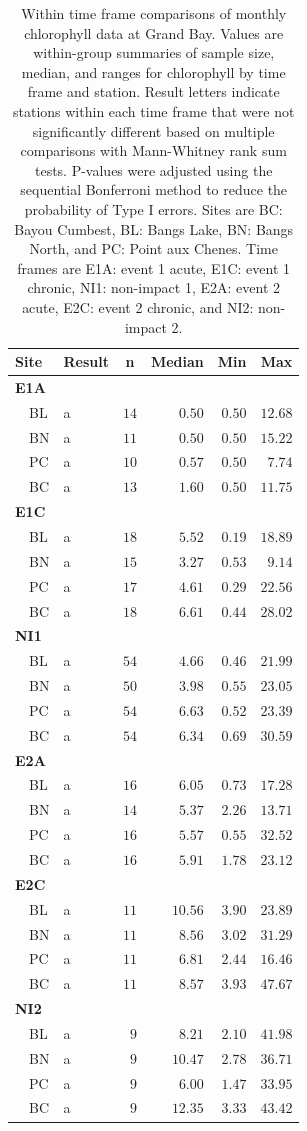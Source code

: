 \documentclass[letterpaper,12pt]{article}\usepackage[]{graphicx}\usepackage[]{color}
\begin{document}
\clearpage

\begin{table}[!tbp]
\caption{Within time frame comparisons of monthly chlorophyll data at Grand Bay.  Values are within-group summaries of sample size, median, and ranges for chlorophyll by time frame and station.  Result letters indicate stations within each time frame that were not significantly different based on multiple comparisons with Mann-Whitney rank sum tests.  P-values were adjusted using the sequential Bonferroni method to reduce the probability of Type I errors. Sites are BC: Bayou Cumbest, BL: Bangs Lake, BN: Bangs North, and PC: Point aux Chenes.  Time frames are E1A: event 1 acute, E1C: event 1 chronic, NI1: non-impact 1, E2A: event 2 acute, E2C: event 2 chronic, and NI2: non-impact 2.\label{tab:chltab2}} 
\begin{center}
\begin{tabular}{llrrrr}
\hline\hline
\multicolumn{1}{l}{Site}&\multicolumn{1}{c}{Result}&\multicolumn{1}{c}{n}&\multicolumn{1}{c}{Median}&\multicolumn{1}{c}{Min}&\multicolumn{1}{c}{Max}\tabularnewline
\hline
{\bfseries E1A}&&&&&\tabularnewline
~~BL&a&$14$&$ 0.50$&$0.50$&$12.68$\tabularnewline
~~BN&a&$11$&$ 0.50$&$0.50$&$15.22$\tabularnewline
~~PC&a&$10$&$ 0.57$&$0.50$&$ 7.74$\tabularnewline
~~BC&a&$13$&$ 1.60$&$0.50$&$11.75$\tabularnewline
\hline
{\bfseries E1C}&&&&&\tabularnewline
~~BL&a&$18$&$ 5.52$&$0.19$&$18.89$\tabularnewline
~~BN&a&$15$&$ 3.27$&$0.53$&$ 9.14$\tabularnewline
~~PC&a&$17$&$ 4.61$&$0.29$&$22.56$\tabularnewline
~~BC&a&$18$&$ 6.61$&$0.44$&$28.02$\tabularnewline
\hline
{\bfseries NI1}&&&&&\tabularnewline
~~BL&a&$54$&$ 4.66$&$0.46$&$21.99$\tabularnewline
~~BN&a&$50$&$ 3.98$&$0.55$&$23.05$\tabularnewline
~~PC&a&$54$&$ 6.63$&$0.52$&$23.39$\tabularnewline
~~BC&a&$54$&$ 6.34$&$0.69$&$30.59$\tabularnewline
\hline
{\bfseries E2A}&&&&&\tabularnewline
~~BL&a&$16$&$ 6.05$&$0.73$&$17.28$\tabularnewline
~~BN&a&$14$&$ 5.37$&$2.26$&$13.71$\tabularnewline
~~PC&a&$16$&$ 5.57$&$0.55$&$32.52$\tabularnewline
~~BC&a&$16$&$ 5.91$&$1.78$&$23.12$\tabularnewline
\hline
{\bfseries E2C}&&&&&\tabularnewline
~~BL&a&$11$&$10.56$&$3.90$&$23.89$\tabularnewline
~~BN&a&$11$&$ 8.56$&$3.02$&$31.29$\tabularnewline
~~PC&a&$11$&$ 6.81$&$2.44$&$16.46$\tabularnewline
~~BC&a&$11$&$ 8.57$&$3.93$&$47.67$\tabularnewline
\hline
{\bfseries NI2}&&&&&\tabularnewline
~~BL&a&$ 9$&$ 8.21$&$2.10$&$41.98$\tabularnewline
~~BN&a&$ 9$&$10.47$&$2.78$&$36.71$\tabularnewline
~~PC&a&$ 9$&$ 6.00$&$1.47$&$33.95$\tabularnewline
~~BC&a&$ 9$&$12.35$&$3.33$&$43.42$\tabularnewline
\hline
\end{tabular}\end{center}

\end{table}

\clearpage
\end{document}
